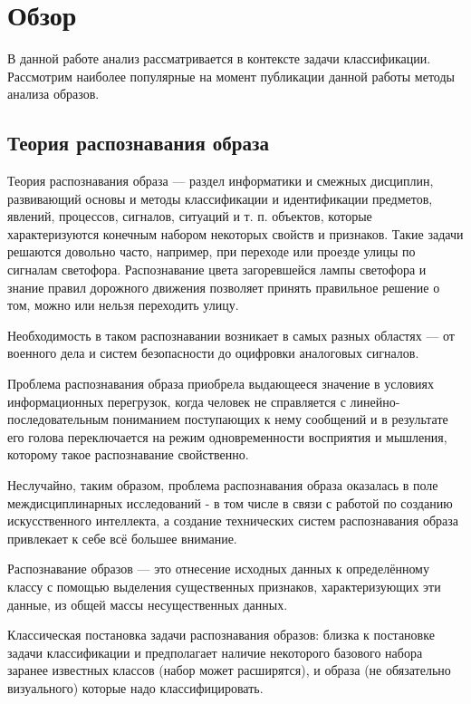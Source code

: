 \chapter{Обзор} \label{chapt2}
В данной работе анализ рассматривается в контексте задачи классификации. Рассмотрим наиболее популярные на момент публикации данной работы методы анализа образов.

\section{Теория распознавания образа}

Теория распознавания образа — раздел информатики и смежных дисциплин, развивающий основы и методы классификации и идентификации предметов, явлений, процессов, сигналов, ситуаций и т. п. объектов, которые характеризуются конечным набором некоторых свойств и признаков. Такие задачи решаются довольно часто, например, при переходе или проезде улицы по сигналам светофора. Распознавание цвета загоревшейся лампы светофора и знание правил дорожного движения позволяет принять правильное решение о том, можно или нельзя переходить улицу.

Необходимость в таком распознавании возникает в самых разных областях — от военного дела и систем безопасности до оцифровки аналоговых сигналов.

Проблема распознавания образа приобрела выдающееся значение в условиях информационных перегрузок, когда человек не справляется с линейно-последовательным пониманием поступающих к нему сообщений и в результате его голова переключается на режим одновременности восприятия и мышления, которому такое распознавание свойственно.

Неслучайно, таким образом, проблема распознавания образа оказалась в поле междисциплинарных исследований - в том числе в связи с работой по созданию искусственного интеллекта, а создание технических систем распознавания образа привлекает к себе всё большее внимание.

Распознавание образов — это отнесение исходных данных к определённому классу с помощью выделения существенных признаков, характеризующих эти данные, из общей массы несущественных данных.

Классическая постановка задачи распознавания образов: близка к постановке задачи классификации и предполагает наличие некоторого базового набора заранее известных классов (набор может расширятся), и образа (не обязательно визуального) которые надо классифицировать.

